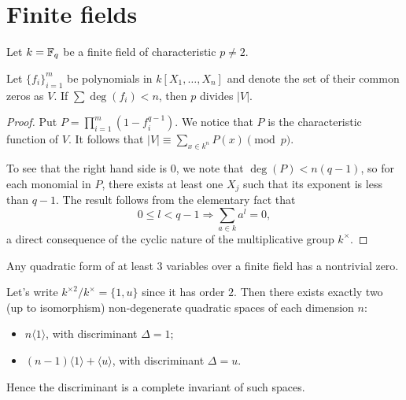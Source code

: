 \documentclass{article}
\begin{document}
\section{Finite fields}\label{sec.finitefld}

Let $k=\mathbb{F}_q$ be a finite field of characteristic $p\neq 2$.

\begin{theorem}
    Let $\{f_i\}_{i=1}^m$ be polynomials in $k[X_1,\ldots,X_n]$ and denote the set of their common zeros as $V$. If $\sum\deg(f_i)<n$, then $p$ divides $\vert V\vert$.
\end{theorem}

\begin{proof}
    Put $P=\prod_{i=1}^m\left(1-f_i^{q-1}\right)$.
    We notice that $P$ is the characteristic function of $V$.
    It follows that $\vert V\vert\equiv\sum_{x\in k^n}P(x)\pmod{p}$.

    To see that the right hand side is $0$, we note that $\deg(P)<n(q-1)$, so for each monomial in $P$, there exists at least one $X_j$ such that its exponent is less than $q-1$. The result follows from the elementary fact that
    \begin{equation*}
        0\leq l<q-1 \Longrightarrow \sum_{a\in k}a^l=0,
    \end{equation*}
    a direct consequence of the cyclic nature of the multiplicative group $k^\times$.
\end{proof}

\begin{corollary}\label{cor.finfld3d}
    Any quadratic form of at least $3$ variables over a finite field has a nontrivial zero.
\end{corollary}

\begin{theorem}
    Let's write $k^{\times 2}/k^\times=\{1,u\}$ since it has order $2$.
    Then there exists exactly two (up to isomorphism) non-degenerate quadratic spaces of each dimension $n$:
    \begin{itemize}
        \item $n\langle 1\rangle$, with discriminant $\Delta=1$;
        \item $(n-1)\langle 1\rangle+\langle u\rangle$, with discriminant $\Delta=u$.
    \end{itemize}
    Hence the discriminant is a complete invariant of such spaces.
\end{theorem}
\end{document}
